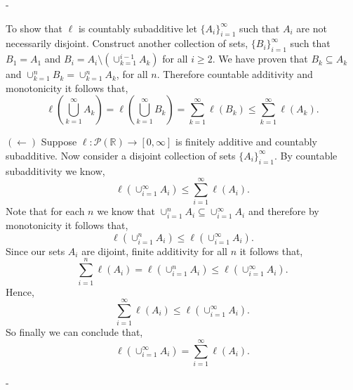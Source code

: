 \documentclass[12pt]{article}
\makeatletter
\theoremstyle{ex215}
\newcounter{probcount}
\newlength\probsep
\newlength\pshrinking
\newenvironment{problems}%
  {\ifhmode\unskip\par\fi\setcounter{probcount}{0}\probsep\parskip
  \sbox\@tempboxa{\textbf{9.}}\pshrinking\wd\@tempboxa\advance\pshrinking\labelsep
  \advance\linewidth -\pshrinking
  \advance\@totalleftmargin\pshrinking
  \advance\leftskip\pshrinking}%
  {\ifhmode\unskip \par\fi\advance\leftskip-\pshrinking}%
\renewenvironment{proof}[1][\proofname]{\par
  \pushQED{\qed}%
  \normalfont \topsep6\p@\@plus6\p@\relax
  \trivlist
  \@topsep \topsep
  \item[\hskip\labelsep
        \itshape
    #1\@addpunct{.}]\ignorespaces
}{%
  \popQED\endtrivlist\@endpefalse
}
\newcommand{\Reals}{\ensuremath{\mathbb R}}
\let\RR\Reals
\makeatother
\begin{document}
\begin{problems}
\begin{proof}
    To show that $\ell$ is countably subadditive let $\{A_i\}_{i = 1}^\infty$ such that $A_i $ are not necessarily disjoint. Construct another collection of sets, $\{B_i\}_{i = 1}^\infty$ such that $B_1 = A_1$ and  $B_i = A_i \setminus \left(\cup_{k = 1}^{i - 1}A_k\right)$ for all $i \geq 2$. We have proven that $B_k \subseteq A_k $ and $\cup_{k = 1}^n B_k = \cup_{k = 1 }^n A_k$, for all $n$. Therefore countable additivity and monotonicity it follows that, 
    \begin{equation*}
      \ell\left(\bigcup_{k = 1}^\infty A_k\right)  =  \ell\left(\bigcup_{k = 1}^\infty B_k\right) = \sum_{k = 1}^{\infty} \ell(B_k) \leq \sum_{k = 1}^{\infty} \ell(A_k). 
    \end{equation*}
  \end{proof}


  \begin{proof}$(\leftarrow)$ Suppose  $\ell: \mathcal{P}(\RR) \to [0, \infty]$ is finitely additive and countably subadditive. Now consider a disjoint collection of sets $\{A_i\}_{i = 1}^\infty$. By countable subadditivity we know, 
    \begin{equation*}
      \ell\left(\cup_{i = 1}^\infty A_i\right) \leq  \sum_{i = 1}^\infty \ell\left(A_i\right).
    \end{equation*}
    Note that for each $n$ we know that $\cup_{i = 1}^n A_i \subseteq \cup_{i = 1}^\infty A_i$ and therefore by monotonicity it follows that, 
    \begin{equation*}
      \ell\left(\cup_{i = 1}^n A_i\right) \leq \ell\left(\cup_{i = 1}^\infty A_i\right).
    \end{equation*}
    Since our sets $A_i$ are dijoint, finite additivity for all $n$ it follows that, 
    \begin{equation*}
      \sum_{i = 1}^n \ell\left(A_i\right)  = \ell\left(\cup_{i = 1}^n A_i\right)\leq \ell\left(\cup_{i = 1}^\infty A_i\right) .
    \end{equation*}
    Hence, 
    \begin{equation*}
     \sum_{i = 1}^\infty \ell\left(A_i\right) \leq \ell\left(\cup_{i = 1}^\infty A_i\right).
    \end{equation*}
    So finally we can conclude that, 
    \begin{equation*}
      \ell\left(\cup_{i = 1}^\infty A_i\right) = \sum_{i = 1}^\infty \ell\left(A_i\right).
    \end{equation*}

    
  \end{proof}
  \vspace*{.15in}







\end{problems}
\end{document}
